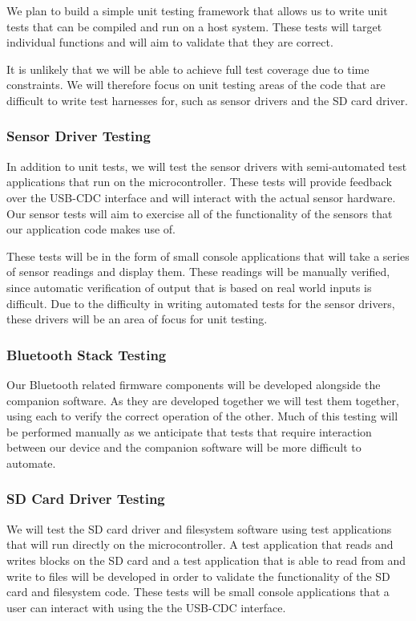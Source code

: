 We plan to build a simple unit testing framework that allows us to write unit
tests that can be compiled and run on a host system. These tests will target
individual functions and will aim to validate that they are correct.

It is unlikely that we will be able to achieve full test coverage due to time
constraints. We will therefore focus on unit testing areas of the code that
are difficult to write test harnesses for, such as sensor drivers and the SD
card driver.

\subsubsection{Sensor Driver Testing}

In addition to unit tests, we will test the sensor drivers with semi-automated
test applications that run on the microcontroller. These tests will provide
feedback over the USB-CDC interface and will interact with the actual sensor
hardware.  Our sensor tests will aim to exercise all of the functionality of the
sensors that our application code makes use of.

These tests will be in the form of small console applications that will take
a series of sensor readings and display them. These readings will be manually
verified, since automatic verification of output that is based on real world
inputs is difficult. Due to the difficulty in writing automated tests for the
sensor drivers, these drivers will be an area of focus for unit testing.

\subsubsection{Bluetooth Stack Testing}

Our Bluetooth related firmware components will be developed alongside the
companion software. As they are developed together we will test them together,
using each to verify the correct operation of the other. Much of this testing
will be performed manually as we anticipate that tests that require interaction
between our device and the companion software will be more difficult to
automate.

\subsubsection{SD Card Driver Testing}

We will test the SD card driver and filesystem software using test applications
that will run directly on the microcontroller. A test application that reads
and writes blocks on the SD card and a test application that is able to read
from and write to files will be developed in order to validate the functionality
of the SD card and filesystem code. These tests will be small console
applications that a user can interact with using the the USB-CDC interface.

